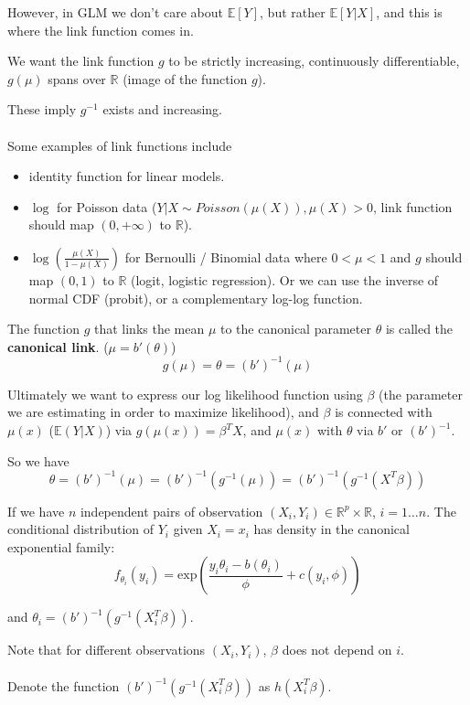\documentclass{article}
\begin{document}
However, in GLM we don't care about $\mathbb{E}[Y]$, but rather $\mathbb{E}[Y | X]$,
and this is where the link function comes in.

We want the link function $g$ to be strictly increasing, continuously differentiable, $g(\mu)$ spans over $\mathbb{R}$ (image of the function $g$).

These imply $g^{-1}$ exists and increasing.
\\
\\
Some examples of link functions include
\begin{itemize}
  \item identity function for linear models.
  \item $\log$ for Poisson data ($Y | X \sim Poisson(\mu(X)), \mu(X) > 0$, link function should map $(0, +\infty)$ to $\mathbb{R}$).
  \item $\log(\frac{\mu(X)}{1 - \mu(X)})$ for Bernoulli / Binomial data where $0 < \mu < 1$ and $g$ should map $(0, 1)$ to $\mathbb{R}$ (logit, logistic regression).
  Or we can use the inverse of normal CDF (probit), or a complementary log-log function.
\end{itemize}

The function $g$ that links the mean $\mu$ to the canonical parameter $\theta$ is called the \textbf{canonical link}.
($\mu = b'(\theta)$)
$$
g(\mu) = \theta = (b')^{-1}(\mu)
$$

Ultimately we want to express our log likelihood function using $\beta$ (the parameter we are estimating in order to maximize likelihood),
and $\beta$ is connected with $\mu(x)$ ($\mathbb{E}(Y | X)$) via $g(\mu(x)) = \beta^T X$, and $\mu(x)$ with $\theta$ via $b'$ or $(b')^{-1}$.

So we have
$$
\theta = (b')^{-1}(\mu) = (b')^{-1}(g^{-1}(\mu)) = (b')^{-1}(g^{-1}(X^T \beta))
$$

If we have $n$ independent pairs of observation $(X_i, Y_i) \in \mathbb{R}^p \times \mathbb{R}$, $i = 1 \dots n$.
The conditional distribution of $Y_i$ given $X_i = x_i$ has density in the canonical exponential family:
$$
f_{\theta_i}(y_i) = \text{exp}(\frac{y_i \theta_i - b(\theta_i)}{\phi} + c(y_i, \phi))
$$

and $\theta_i = (b')^{-1}(g^{-1}(X_i^T \beta))$.

Note that for different observations $(X_i, Y_i)$, $\beta$ does not depend on $i$.
\\
\\
Denote the function $(b')^{-1}(g^{-1}(X_i^T \beta))$ as $h(X_i^T \beta)$.
\end{document}

